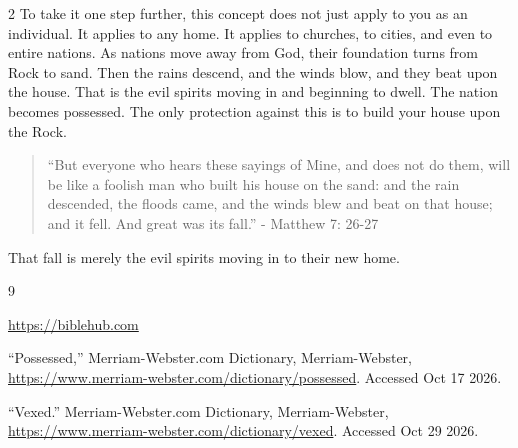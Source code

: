 \documentclass[10pt]{article}
\begin{document}
\begin{multicols}{2}
To take it one step further, this concept does not just apply to you as an individual. It applies to any home. It applies to churches, to cities, and even to entire nations. As nations move away from God, their foundation turns from Rock to sand. Then the rains descend, and the winds blow, and they beat upon the house. That is the evil spirits moving in and beginning to dwell. The nation becomes possessed. The only protection against this is to build your house upon the Rock.


\begin{quotation}
``But everyone who hears these sayings of Mine, and does not do them, will be like a foolish man who built his house on the sand:  and the rain descended, the floods came, and the winds blew and beat on that house; and it fell. And great was its fall.'' - Matthew 7:
26-27
\end{quotation}
That fall is merely the evil spirits moving in to their new home.


\begin{thebibliography}{9}
{\footnotesize
	 \url{https://biblehub.com}
	
	 ``Possessed,'' Merriam-Webster.com Dictionary, Merriam-Webster, \url{https://www.merriam-webster.com/dictionary/possessed}. Accessed Oct 17 2026.
	
	 ``Vexed.'' Merriam-Webster.com Dictionary, Merriam-Webster, \url{https://www.merriam-webster.com/dictionary/vexed}. Accessed Oct 29 2026.
}
\end{thebibliography}

\end{multicols}


\end{document}
